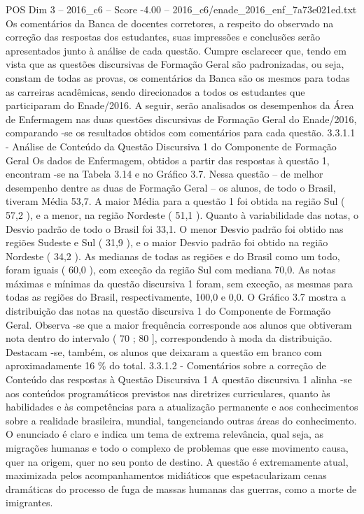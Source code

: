 \begin{textsample}{POS Dim 3 – 2016\_c6 – Score -4.00 – 2016\_c6/enade\_2016\_enf\_7a73e021ed.txt}
Os comentários da Banca de docentes corretores, a respeito do observado na correção das respostas dos estudantes, suas impressões e conclusões serão apresentados junto à análise de cada questão.
Cumpre esclarecer que, tendo em vista que as questões discursivas de Formação Geral são padronizadas, ou seja, constam de todas as provas, os comentários da Banca são os mesmos para todas as carreiras acadêmicas, sendo direcionados a todos os estudantes que participaram do Enade/2016.
A seguir, serão analisados os desempenhos da Área de Enfermagem nas duas questões discursivas de Formação Geral do Enade/2016, comparando -se os resultados obtidos com comentários para cada questão. 3.3.1.1 - Análise de Conteúdo da Questão Discursiva 1 do Componente de Formação Geral Os dados de Enfermagem, obtidos a partir das respostas à questão 1, encontram -se na Tabela 3.14 e no Gráfico 3.7.
Nessa questão – de melhor desempenho dentre as duas de Formação Geral – os alunos, de todo o Brasil, tiveram Média 53,7.
A maior Média para a questão 1 foi obtida na região Sul ( 57,2 ), e a menor, na região Nordeste ( 51,1 ).
Quanto à variabilidade das notas, o Desvio padrão de todo o Brasil foi 33,1.
O menor Desvio padrão foi obtido nas regiões Sudeste e Sul ( 31,9 ), e o maior Desvio padrão foi obtido na região Nordeste ( 34,2 ).
As medianas de todas as regiões e do Brasil como um todo, foram iguais ( 60,0 ), com exceção da região Sul com mediana 70,0.
As notas máximas e mínimas da questão discursiva 1 foram, sem exceção, as mesmas para todas as regiões do Brasil, respectivamente, 100,0 e 0,0.
O Gráfico 3.7 mostra a distribuição das notas na questão discursiva 1 do Componente de Formação Geral.
Observa -se que a maior frequência corresponde aos alunos que obtiveram nota dentro do intervalo ( 70 ; 80 ], correspondendo à moda da distribuição.
Destacam -se, também, os alunos que deixaram a questão em branco com aproximadamente 16 \% do total. 3.3.1.2 - Comentários sobre a correção de Conteúdo das respostas à Questão Discursiva 1 A questão discursiva 1 alinha -se aos conteúdos programáticos previstos nas diretrizes curriculares, quanto às habilidades e às competências para a atualização permanente e aos conhecimentos sobre a realidade brasileira, mundial, tangenciando outras áreas do conhecimento.
O enunciado é claro e indica um tema de extrema relevância, qual seja, as migrações humanas e todo o complexo de problemas que esse movimento causa, quer na origem, quer no seu ponto de destino.
A questão é extremamente atual, maximizada pelos acompanhamentos midiáticos que espetacularizam cenas dramáticas do processo de fuga de massas humanas das guerras, como a morte de imigrantes.

\end{textsample}
